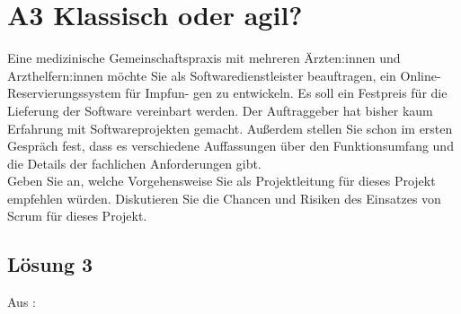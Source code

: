 \documentclass[main.tex]{subfiles}
\begin{document}
\section{A3 Klassisch oder agil?}

Eine medizinische Gemeinschaftspraxis mit mehreren Ärzten:innen und Arzthelfern:innen
möchte Sie als Softwaredienstleister beauftragen, ein Online-Reservierungssystem für Impfun-
gen zu entwickeln. Es soll ein Festpreis für die Lieferung der Software vereinbart werden. Der
Auftraggeber hat bisher kaum Erfahrung mit Softwareprojekten gemacht. Außerdem stellen Sie
schon im ersten Gespräch fest, dass es verschiedene Auffassungen über den Funktionsumfang
und die Details der fachlichen Anforderungen gibt.\\

Geben Sie an, welche Vorgehensweise Sie als Projektleitung für dieses Projekt empfehlen würden.
Diskutieren Sie die Chancen und Risiken des Einsatzes von Scrum für dieses Projekt.

\subsection{Lösung 3}
Aus \cite{openai2023chatgpt4}:

\end{document}

